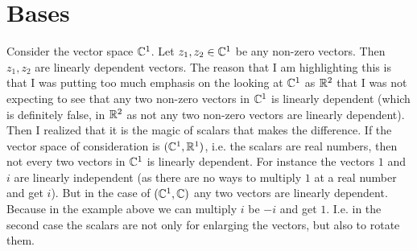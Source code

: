 \section{Bases}
\begin{observation}
	Consider the vector space $ \mathbb{C}^1 $. Let $ z_1,z_2 \in \mathbb{C}^1 $ be any non-zero vectors. Then $ z_1,z_2 $ are linearly dependent vectors. The reason that I am highlighting this is that I was putting too much emphasis on the looking at $ \mathbb{C}^1 $ as $ \mathbb{R}^2 $ that I was not expecting to see that any two non-zero vectors in $ \mathbb{C}^1 $ is linearly dependent (which is definitely false, in $ \mathbb{R}^2 $ as not any two non-zero vectors are linearly dependent). Then I realized that it is the magic of scalars that makes the difference. If the vector space of consideration is $ (\mathbb{C}^1,\mathbb{R}^1) $, i.e. the scalars are real numbers, then not every two vectors in $ \mathbb{C}^1 $ is linearly dependent. For instance the vectors $ 1 $ and $ i $ are linearly independent (as there are no ways to multiply $ 1 $ at a real number and get $ i $). But in the case of $ (\mathbb{C}^1, \mathbb{C}) $ any two vectors are linearly dependent. Because in the example above we can multiply $ i $ be $ -i $ and get $ 1 $. I.e. in the second case the scalars are not only for enlarging the vectors, but also to rotate them.
\end{observation}



